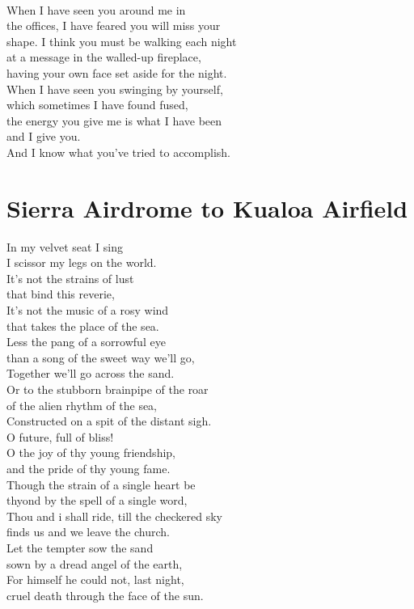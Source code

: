 \documentclass[smalldemyvopaper,11pt,twoside,onecolumn,openright,extrafontsizes]{memoir}
\begin{document}
\\When I have seen you around me in
\\the offices, I have feared you will miss your
\\shape. I think you must be walking each night
\\at a message in the walled-up fireplace,
\\having your own face set aside for the night.
\\When I have seen you swinging by yourself,
\\which sometimes I have found fused,
\\the energy you give me is what I have been
\\and I give you.
\\And I know what you've tried to accomplish.



\chapter{Sierra Airdrome to Kualoa Airfield}
In my velvet seat I sing
\\I scissor my legs on the world.
\\It's not the strains of lust
\\that bind this reverie,
\\It's not the music of a rosy wind
\\that takes the place of the sea.
\\Less the pang of a sorrowful eye
\\than a song of the sweet way we'll go,
\\Together we'll go across the sand.
\\Or to the stubborn brainpipe of the roar
\\of the alien rhythm of the sea,
\\Constructed on a spit of the distant sigh.
\\O future, full of bliss!
\\O the joy of thy young friendship,
\\and the pride of thy young fame.
\\Though the strain of a single heart be
\\thyond by the spell of a single word,
\\Thou and i shall ride, till the checkered sky
\\finds us and we leave the church.
\\Let the tempter sow the sand
\\sown by a dread angel of the earth,
\\For himself he could not, last night,
\\cruel death through the face of the sun.
\end{document}
